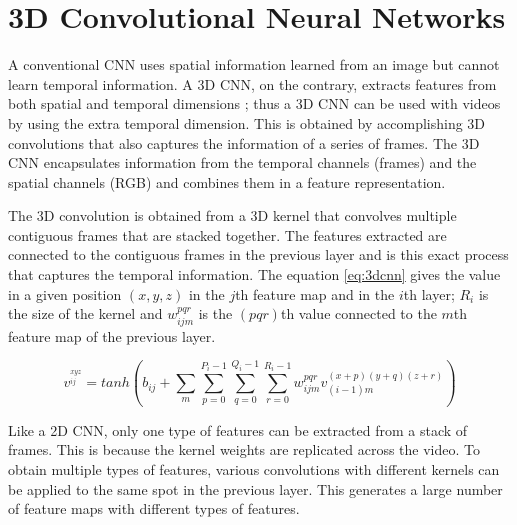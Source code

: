\section{3D Convolutional Neural Networks}

A conventional CNN uses spatial information learned from an image but cannot learn temporal information. A 3D CNN, on the contrary, extracts features from both spatial and temporal dimensions ; thus a 3D CNN can be used with videos by using the extra temporal dimension. This is obtained by accomplishing 3D convolutions that also captures the information of a series of frames. The 3D CNN encapsulates information from the temporal channels (frames) and the spatial channels (RGB) and combines them in a feature representation. \cite{Ji3DRecognition}



The 3D convolution is obtained from a 3D kernel that convolves multiple contiguous frames that are stacked together. The features extracted are connected to the contiguous frames in the previous layer and is this exact process that captures the temporal information. The equation \ref{eq:3dcnn} gives the value in a given position $(x,y,z)$ in the $j$th feature map and in the $i$th layer; $R{_i}$ is the size of the kernel and $w_{ijm}^{pqr}$ is the $(pqr)$th value connected to the $m$th feature map of the previous layer. \cite{Tran2015LearningNetworks}

\begin{equation} \label{eq:3dcnn}
v^{_{ij}^{xyz}} = tanh\left ( b_{ij} + \sum_{m}\sum_{p=0}^{P_{i}-1}\sum_{q=0}^{Q_{i}-1}\sum_{r=0}^{R_{i}-1}  w_{ijm}^{pqr} v_{(i-1)m}^{(x+p)(y+q)(z+r)} \right )
\end{equation}

Like a 2D CNN, only one type of features can be extracted from a stack of frames. This is because the kernel weights are replicated across the video. To obtain multiple types of features, various convolutions with different kernels can be applied to the same spot in the previous layer. This generates a large number of feature maps with different types of features.

